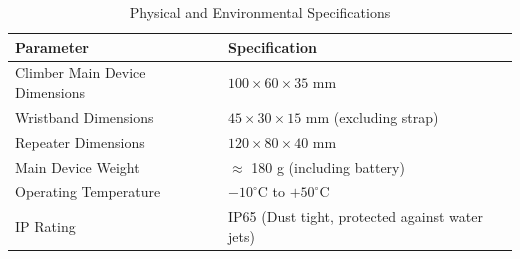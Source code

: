 \begin{table}[htbp]
\centering
\caption{Physical and Environmental Specifications}
\label{tab:spec-physical}
\begin{tabular}{@{}ll@{}}
\toprule
\textbf{Parameter} & \textbf{Specification} \\ \midrule
Climber Main Device Dimensions & $100 \times 60 \times 35$ mm \\
Wristband Dimensions & $45 \times 30 \times 15$ mm (excluding strap) \\
Repeater Dimensions & $120 \times 80 \times 40$ mm \\
Main Device Weight & $\approx$ 180 g (including battery) \\
Operating Temperature & $-10^\circ$C to $+50^\circ$C \\
IP Rating & IP65 (Dust tight, protected against water jets) \\
\bottomrule
\end{tabular}
\end{table}
